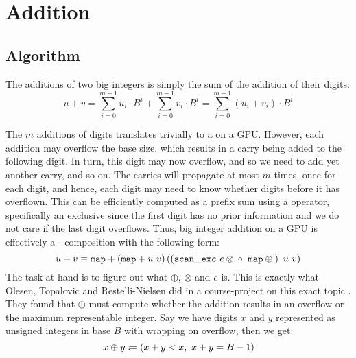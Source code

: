 \section{Addition}

\subsection{Algorithm}

The additions of two big integers is simply the sum of the addition of their digits:
\begin{equation}
  \label{eq:add}
  u + v = \sum_{i=0}^{m-1}u_i\cdot B^{i} + \sum_{i=0}^{m-1}v_i\cdot B^{i} = \sum_{i=0}^{m-1}(u_i+v_i)\cdot B^{i}
\end{equation}

The $m$ additions of digits translates trivially to a  on a GPU. However, each addition may overflow the base size, which results in a carry being added to the following digit. In turn, this digit may now overflow, and so we need to add yet another carry, and so on. The carries will propagate at most $m$ times, once for each digit, and hence, each digit may need to know whether digits before it has overflown. This can be efficiently computed as a prefix sum using a  operator, specifically an exclusive  since the first digit has no prior information and we do not care if the last digit overflows. Thus, big integer addition on a GPU is effectively a - composition with the following form:
\begin{equation}
\label{eq:addgpu}
u + v \equiv \mathtt{map} + \left( \mathtt{map} + u~v\right) \left(\left({\mathtt{scan\_exc}~e \otimes \phantom{}} \circ~\mathtt{map} \oplus \phantom{}\right)~u~v\right)
\end{equation}
The task at hand is to figure out what $\oplus$, $\otimes$ and $e$ is. This is exactly what Olesen, Topalovic and Restelli-Nielsen did in a course-project on this exact topic \cite{DPP-PROJECT}. They found that $\oplus$ must compute whether the addition results in an overflow or the maximum representable integer. Say we have digits $x$ and $y$ represented as unsigned integers in base $B$ with wrapping on overflow, then we get:
\begin{equation}
\label{eq:oplus}
x \oplus y \coloneq (x + y < x,~x + y = B-1)
\end{equation}

